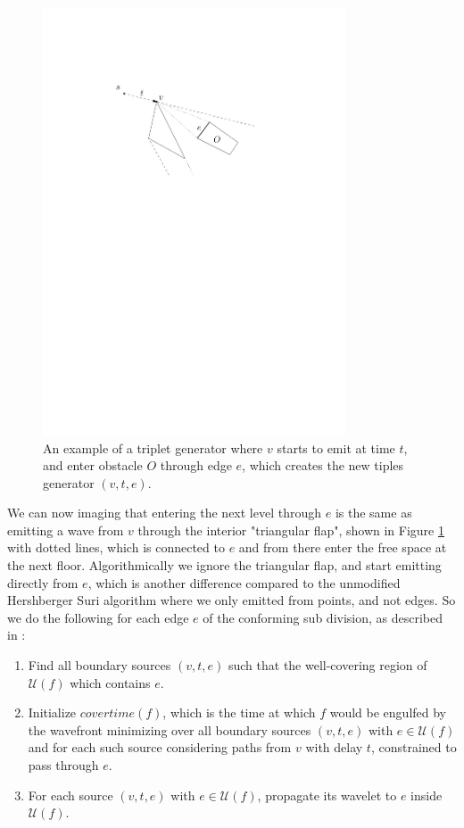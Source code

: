 \begin{figure}[H]
	\centering
	\includegraphics[width=0.8\textwidth]{figures/tripletgenerator.pdf}
	\caption{An example of a triplet generator where $v$ starts to emit at time $t$, and enter obstacle $O$ through edge $e$, which 
	         creates the new tiples generator $(v,t,e)$. }
	\label{fig:tripletgenerator}
\end{figure}

We can now imaging that entering the next level through $e$ is the same as emitting a wave from $v$ through the interior "triangular 
flap", shown in Figure \ref{fig:tripletgenerator} with dotted lines, which is connected to $e$ and from there enter the free space at the 
next floor. Algorithmically we ignore the triangular flap, and start emitting directly from $e$, which is another difference compared to 
the unmodified Hershberger Suri algorithm where we only emitted from points, and not edges. So we do the following for each edge $e$ of 
the conforming sub division, as described in \cite{HershbergerKS17}:

\begin{enumerate}
    \item Find all boundary sources $(v,t,e)$ such that the well-covering region of $\mathcal{U}(f)$ which contains $e$.
    \item Initialize $covertime(f)$, which is the time at which $f$ would be engulfed by the wavefront minimizing over all boundary 
          sources $(v,t,e)$ with $e \in \mathcal{U}(f)$ and for each such source considering paths from $v$ with delay $t$, constrained to
          pass through $e$.
    \item For each source $(v,t,e)$ with $e \in \mathcal{U}(f)$, propagate its wavelet to $e$ inside $\mathcal{U}(f)$.
\end{enumerate}

